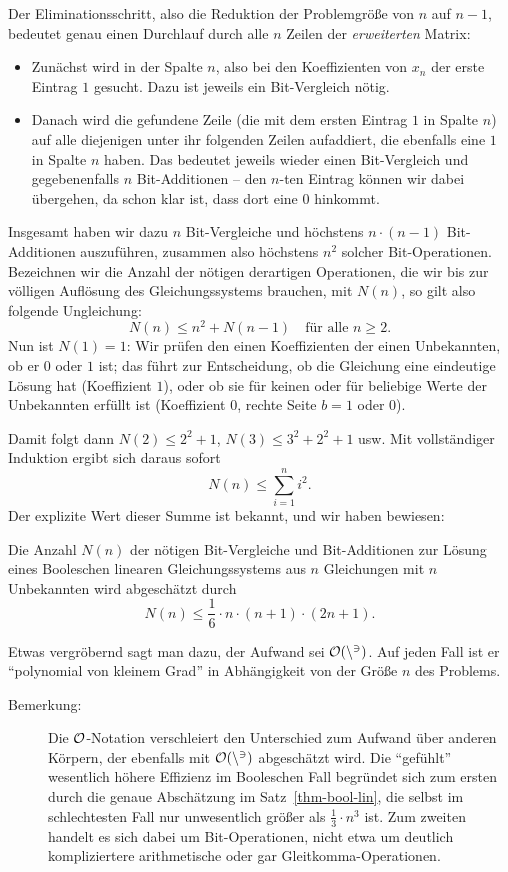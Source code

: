 \begin{refsegment}
Der Eliminationsschritt, also die Reduktion der Problemgröße von $n$
auf $n-1$, bedeutet genau einen Durchlauf durch alle $n$ Zeilen der
{\em erweiterten} Matrix:
\begin{itemize}
   \item Zunächst wird in der Spalte $n$, also bei den Koeffizienten
      von $x_n$ der erste Eintrag $1$ gesucht. Dazu ist jeweils ein
      Bit-Vergleich nötig.
   \item Danach wird die gefundene Zeile (die mit dem ersten Eintrag $1$
      in Spalte $n$) auf alle diejenigen unter ihr folgenden Zeilen
      aufaddiert, die ebenfalls eine $1$ in Spalte $n$ haben. Das
      bedeutet jeweils wieder einen Bit-Vergleich und gegebenenfalls
      $n$ Bit-Additionen -- den $n$-ten Eintrag können wir dabei
      übergehen, da schon klar ist, dass dort eine $0$ hinkommt.
\end{itemize}
Insgesamt haben wir dazu $n$ Bit-Vergleiche und höchstens $n\cdot (n-1)$
Bit-Additionen auszuführen, zusammen also höchstens $n^2$ solcher
Bit-Operationen. Bezeichnen wir die Anzahl der nötigen derartigen
Operationen, die wir bis zur völligen Auflösung des Gleichungssystems
brauchen, mit $N(n)$, so gilt also folgende Ungleichung:
\[
     N(n) \leq n^2 + N(n-1) \quad \text{für alle } n \geq 2.
\]
Nun ist $N(1) = 1$: Wir prüfen den einen Koeffizienten der einen
Unbekannten, ob er $0$ oder $1$ ist; das führt zur Entscheidung,
ob die Gleichung eine eindeutige Lösung hat (Koeffizient $1$),
oder ob sie für keinen oder für beliebige Werte der Unbekannten erfüllt
ist (Koeffizient $0$, rechte Seite $b = 1$ oder $0$).

Damit folgt dann $N(2) \leq 2^2 + 1$, $N(3) \leq 3^2 + 2^2 + 1$ usw.
Mit vollständiger Induktion ergibt sich daraus sofort
\[
     N(n) \leq \sum_{i=1}^n i^2.
\]
Der explizite Wert dieser Summe ist bekannt, und wir haben bewiesen:

\begin{satz}\label{thm-bool-lin}
   Die Anzahl $N(n)$ der nötigen Bit-Vergleiche und Bit-Additionen
   zur Lösung eines Booleschen linearen Gleichungssystems aus $n$
   Gleichungen mit $n$ Unbekannten wird abgeschätzt durch
\[
     N(n) \leq \frac{1}{6} \cdot n \cdot (n+1) \cdot (2n+1).
\]
\end{satz}

Etwas vergröbernd sagt man dazu, der Aufwand sei $\cal{O}(n^3)$. Auf jeden
Fall ist er "`polynomial von kleinem Grad"' in Abhängigkeit von der
Größe $n$ des Problems.

\begin{description}
   \item[Bemerkung:] Die $\cal{O}$-Notation verschleiert den Unterschied zum
      Aufwand über anderen Körpern, der ebenfalls mit $\cal{O}(n^3)$ abgeschätzt
      wird. Die "`gefühlt"' wesentlich höhere Effizienz im Booleschen Fall
      begründet sich zum ersten durch die genaue Abschätzung im
      Satz~\ref{thm-bool-lin}, die selbst im schlechtesten Fall nur
      unwesentlich größer als $\frac{1}{3} \cdot n^3$ ist. Zum zweiten
      handelt es sich dabei um Bit-Operationen, nicht etwa um deutlich
      kompliziertere arithmetische oder gar Gleitkomma-Operationen.
\end{description}


\end{refsegment}
